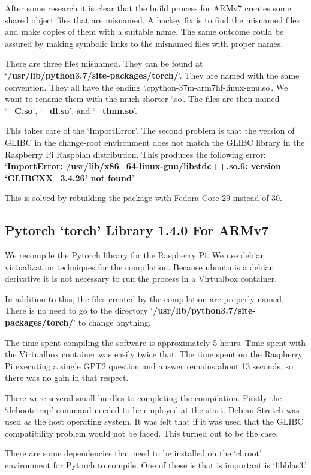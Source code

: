 After some research it is clear that the build process for ARMv7 creates some shared object files that are misnamed. A hackey fix is to find the misnamed files and make copies of them with a suitable name. The same outcome could be assured by making symbolic links to the misnamed files with proper names.

There are three files misnamed. They can be found at `\textbf{/usr/lib/python3.7/site-packages/torch/}'. They are named with the same convention. They all have the ending `.cpython-37m-arm7hf-linux-gnu.so'. We want to rename them with the much shorter `.so'. The files are then named `\textbf{\_C.so}', `\textbf{\_dl.so}', and `\textbf{\_thnn.so}'.

This takes care of the `ImportError'. The second problem is that the version of GLIBC in the change-root environment does not match the GLIBC library in the Raspberry Pi Raspbian distribution. This produces the following error: `\textbf{ImportError: /usr/lib/x86\_64-linux-gnu/libstdc++.so.6: version `GLIBCXX\_3.4.26' not found}'.

This is solved by rebuilding the package with Fedora Core 29 instead of 30. 
 
\subsection*{Pytorch `torch' Library 1.4.0 For ARMv7}
We recompile the Pytorch library for the Raspberry Pi. We use debian virtualization techniques for the compilation. Because ubuntu is a debian derivative it is not necessary to run the process in a Virtualbox container. 

In addition to this, the files created by the compilation are properly named. There is no need to go to the directory `\textbf{/usr/lib/python3.7/site-packages/torch/}' to change anything. 

The time spent compiling the software is approximately 5 hours. Time spent with the Virtualbox container was easily twice that. The time spent on the Raspberry Pi executing a single GPT2 question and answer remains about 13 seconds, so there was no gain in that respect.

There were several small hurdles to completing the compilation. Firstly the `debootstrap' command needed to be employed at the start. Debian Stretch was used as the host operating system. It was felt that if it was used that the GLIBC compatibility problem would not be faced. This turned out to be the case.

There are some dependencies that need to be installed on the `chroot' environment for Pytorch to compile. One of these is that is important is `libblas3.'

